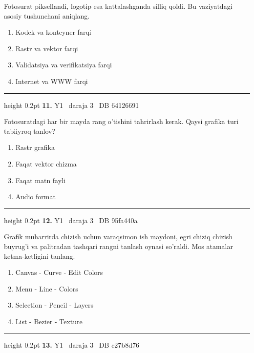 \documentclass[10pt,a4paper,oneside]{article}
\begin{document}
\par
Fotosurat piksellandi, logotip esa kattalashganda silliq qoldi. Bu vaziyatdagi asosiy tushunchani aniqlang.
\begin{enumerate}[label=\Alph*),leftmargin=9mm]
\item Kodek va konteyner farqi
\item Rastr va vektor farqi
\item Validatsiya va verifikatsiya farqi
\item Internet va WWW farqi
\end{enumerate}
\vspace{2mm}\hrule height 0.2pt \vspace{4mm}
\hypertarget{q11}{\textbf{\color{ink}11.}}  {\color{muted}\scriptsize Y1 \textbullet\ daraja 3 \textbullet\ DB 64126691}
\par
Fotosuratdagi har bir mayda rang o'tishini tahrirlash kerak. Qaysi grafika turi tabiiyroq tanlov?
\begin{enumerate}[label=\Alph*),leftmargin=9mm]
\item Rastr grafika
\item Faqat vektor chizma
\item Faqat matn fayli
\item Audio format
\end{enumerate}
\vspace{2mm}\hrule height 0.2pt \vspace{4mm}
\hypertarget{q12}{\textbf{\color{ink}12.}}  {\color{muted}\scriptsize Y1 \textbullet\ daraja 3 \textbullet\ DB 95fa440a}
\par
Grafik muharrirda chizish uchun varaqsimon ish maydoni, egri chiziq chizish buyrug'i va palitradan tashqari rangni tanlash oynasi so'raldi. Mos atamalar ketma-ketligini tanlang.
\begin{enumerate}[label=\Alph*),leftmargin=9mm]
\item Canvas - Curve - Edit Colors
\item Menu - Line - Colors
\item Selection - Pencil - Layers
\item List - Bezier - Texture
\end{enumerate}
\vspace{2mm}\hrule height 0.2pt \vspace{4mm}
\hypertarget{q13}{\textbf{\color{ink}13.}}  {\color{muted}\scriptsize Y1 \textbullet\ daraja 3 \textbullet\ DB c27b8d76}
\par
\end{document}
